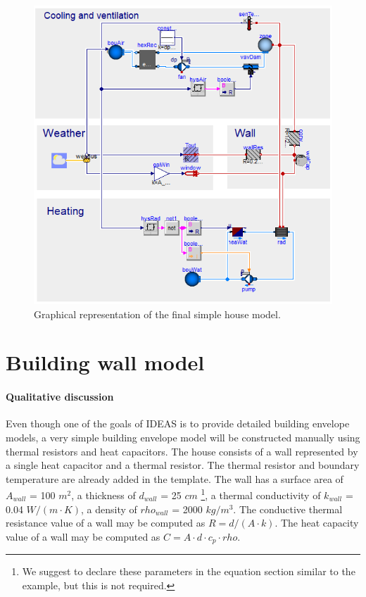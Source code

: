 \documentclass[10pt,a4paper]{article}
\begin{document}
\begin{figure}[h!]
\centering
\includegraphics[scale=0.46]{simpleHouse.png}
\caption{Graphical representation of the final simple house model.}
\label{fig:simpleHouse}
\end{figure}


\section{Building wall model}
\paragraph{Qualitative discussion}
Even though one of the goals of IDEAS is to provide
detailed building envelope models, a very simple building
envelope model will be constructed manually using thermal
resistors and heat capacitors.
The house consists of a wall represented 
by a single heat capacitor and a thermal resistor. 
The thermal resistor and boundary temperature 
are already added in the template.
The wall has a surface area of $A_{wall}$ = 100 $m^2$, 
a thickness of $d_{wall}$ = 25 $cm$
\footnote{We suggest to declare these parameters in the equation section similar to the example, but this is not required.}, 
a thermal conductivity of $k_{wall}$ = 0.04 $W/(m\cdot K)$, 
a density of $rho_{wall}$ = 2000 $kg/m^3$.
The conductive thermal resistance value of a wall may be computed as $R=d/(A\cdot k)$.
The heat capacity value of a wall may be computed as $C=A\cdot d \cdot c_p \cdot rho$.
\end{document}
